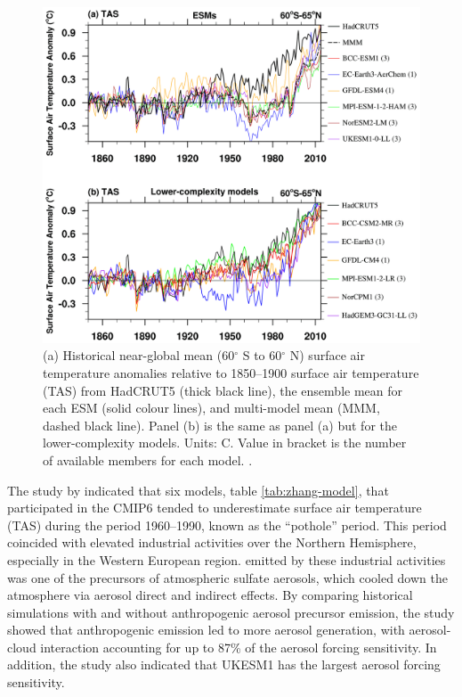 \begin{figure}
    \centering
    \includegraphics[width=6in]{Chapter1/figs/pothole_figure_Zhang2021.png}
    \caption[Anomalous cooling in the Earth system models participating in CMIP6]{(a) Historical near-global mean (60$^\circ$ S to 60$^\circ$ N) surface air temperature anomalies relative to 1850--1900 surface air temperature (TAS) from HadCRUT5 (thick black line), the ensemble mean for each ESM (solid colour lines), and multi-model mean (MMM, dashed black line). Panel (b) is the same as panel (a) but for the lower-complexity models. Units: \textdegree C. Value in bracket is the number of available members for each model. \citep{zhangRoleAnthropogenicAerosols2021}.}
    \label{fig:zhang-pothole}
\end{figure}

The study by \citet{zhangRoleAnthropogenicAerosols2021} indicated that six models, table \ref{tab:zhang-model}, that participated in the CMIP6 tended to underestimate surface air temperature (TAS) during the period 1960--1990, known as the “pothole” period. This period coincided with elevated industrial activities over the Northern Hemisphere, especially in the Western European region.  emitted by these industrial activities was one of the precursors of atmospheric sulfate aerosols, which cooled down the atmosphere via aerosol direct and indirect effects. By comparing historical simulations with and without anthropogenic aerosol precursor emission, the study showed that anthropogenic emission led to more aerosol generation, with aerosol-cloud interaction accounting for up to 87\% of the aerosol forcing sensitivity. In addition, the study also indicated that UKESM1 has the largest aerosol forcing sensitivity. 


